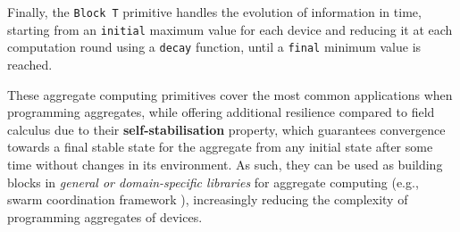 Finally, the \texttt{Block T} primitive handles the evolution of information in
time, starting from an \texttt{initial} maximum value for each device and
reducing it at each computation round using a \texttt{decay} function, until a
\texttt{final} minimum value is reached.

These aggregate computing primitives cover the most common applications when
programming aggregates, while offering additional resilience compared to field
calculus due to their \textbf{self-stabilisation} property, which guarantees
convergence towards a final stable state for the aggregate from any initial
state after some time without changes in its environment. As such, they can be
used as building blocks in \textit{general or domain-specific libraries} for
aggregate computing (e.g., swarm coordination framework \cite{MacroSwarm}),
increasingly reducing the complexity of programming aggregates of devices.
